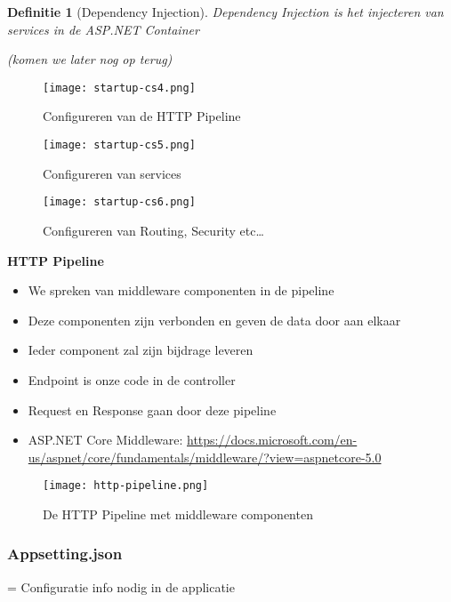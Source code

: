 \documentclass{article}
\newtheorem{theorem}{Definitie}[section]
\begin{document}
\begin{theorem}[Dependency Injection]

Dependency Injection is het injecteren van services in de ASP.NET Container

(komen we later nog op terug)
\end{theorem}

\begin{figure}[H]
    \centering
    \texttt{[image: startup-cs4.png]}
    \caption{Configureren van de HTTP Pipeline}
\end{figure}
\begin{figure}[H]
    \centering
    \texttt{[image: startup-cs5.png]}
    \caption{Configureren van services}
\end{figure}
\begin{figure}[H]
    \centering
    \texttt{[image: startup-cs6.png]}
    \caption{Configureren van Routing, Security etc\dots}
\end{figure}


\textbf{HTTP Pipeline}

\begin{itemize}
    \item We spreken van middleware componenten in de pipeline
    \item Deze componenten zijn verbonden en geven de data door aan elkaar
    \item Ieder component zal zijn bijdrage leveren
    \item Endpoint is onze code in de controller
    \item Request en Response gaan door deze pipeline
    \item ASP.NET Core Middleware: \url{https://docs.microsoft.com/en-us/aspnet/core/fundamentals/middleware/?view=aspnetcore-5.0}
\end{itemize}

\begin{figure}[H]
    \centering
    \texttt{[image: http-pipeline.png]}
    \caption{De HTTP Pipeline met middleware componenten}
\end{figure}

\subsubsection{Appsetting.json}

= Configuratie info nodig in de applicatie
\end{document}
